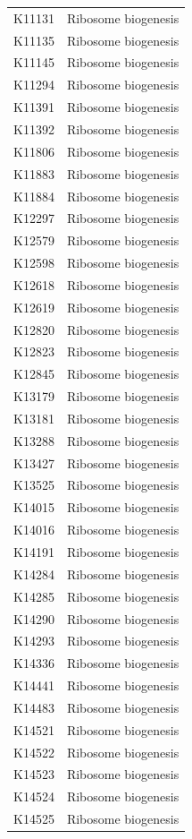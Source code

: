 \begin{longtable}{@{}l l@{}}
K11131 & Ribosome biogenesis \\
K11135 & Ribosome biogenesis \\
K11145 & Ribosome biogenesis \\
K11294 & Ribosome biogenesis \\
K11391 & Ribosome biogenesis \\
K11392 & Ribosome biogenesis \\
K11806 & Ribosome biogenesis \\
K11883 & Ribosome biogenesis \\
K11884 & Ribosome biogenesis \\
K12297 & Ribosome biogenesis \\
K12579 & Ribosome biogenesis \\
K12598 & Ribosome biogenesis \\
K12618 & Ribosome biogenesis \\
K12619 & Ribosome biogenesis \\
K12820 & Ribosome biogenesis \\
K12823 & Ribosome biogenesis \\
K12845 & Ribosome biogenesis \\
K13179 & Ribosome biogenesis \\
K13181 & Ribosome biogenesis \\
K13288 & Ribosome biogenesis \\
K13427 & Ribosome biogenesis \\
K13525 & Ribosome biogenesis \\
K14015 & Ribosome biogenesis \\
K14016 & Ribosome biogenesis \\
K14191 & Ribosome biogenesis \\
K14284 & Ribosome biogenesis \\
K14285 & Ribosome biogenesis \\
K14290 & Ribosome biogenesis \\
K14293 & Ribosome biogenesis \\
K14336 & Ribosome biogenesis \\
K14441 & Ribosome biogenesis \\
K14483 & Ribosome biogenesis \\
K14521 & Ribosome biogenesis \\
K14522 & Ribosome biogenesis \\
K14523 & Ribosome biogenesis \\
K14524 & Ribosome biogenesis \\
K14525 & Ribosome biogenesis \\

\end{longtable}
